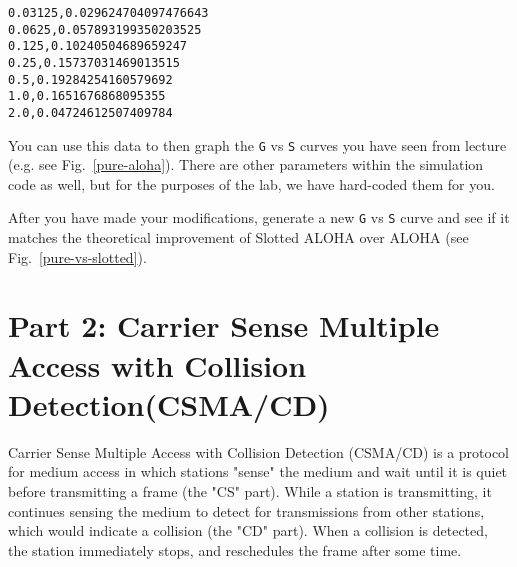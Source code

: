 \documentclass[11pt]{article}
\begin{document}
\begin{lstlisting}[style=ece361shell, caption={Sample data from \texttt{out.txt} for ALOHA}, label={lst:aloha-output}]
0.03125,0.029624704097476643
0.0625,0.057893199350203525
0.125,0.10240504689659247
0.25,0.15737031469013515
0.5,0.19284254160579692
1.0,0.1651676868095355
2.0,0.04724612507409784
\end{lstlisting}


You can use this data to then graph the \texttt{G} vs \texttt{S} curves you have seen from lecture (e.g. see Fig.~\ref{pure-aloha}).
There are other parameters within the simulation code as well, but for the purposes of the lab, we have hard-coded them for you.



After you have made your modifications, generate a new \texttt{G} vs \texttt{S} curve and see if it matches the theoretical improvement of Slotted ALOHA over ALOHA (see Fig.~\ref{pure-vs-slotted}).




\section{Part 2: Carrier Sense Multiple Access with Collision Detection\newline(CSMA/CD)}
\label{sec:csma-cd}
Carrier Sense Multiple Access with Collision Detection (CSMA/CD) is a protocol for medium access in which stations "sense" the medium and wait until it is quiet before transmitting a frame (the "CS" part).
While a station is transmitting, it continues sensing the medium to detect for transmissions from other stations, which would indicate a collision (the "CD" part).
When a collision is detected, the station immediately stops, and reschedules the frame after some time.
\end{document}
